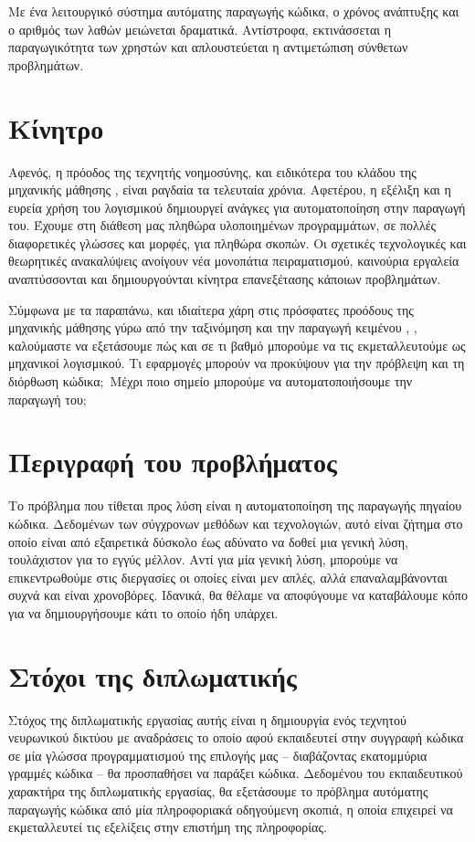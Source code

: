Με ένα λειτουργικό σύστημα αυτόματης παραγωγής κώδικα, ο χρόνος ανάπτυξης και ο αριθμός των λαθών μειώνεται δραματικά. 
Αντίστροφα, εκτινάσσεται η παραγωγικότητα των χρηστών και απλουστεύεται η αντιμετώπιση σύνθετων προβλημάτων.

\section{Κίνητρο}
Αφενός, η πρόοδος της τεχνητής νοημοσύνης, και ειδικότερα του κλάδου της μηχανικής μάθησης , είναι ραγδαία τα τελευταία χρόνια.
Αφετέρου, η εξέλιξη και η ευρεία χρήση του λογισμικού δημιουργεί ανάγκες για αυτοματοποίηση στην παραγωγή του.
Έχουμε στη διάθεση μας πληθώρα υλοποιημένων προγραμμάτων, σε πολλές διαφορετικές γλώσσες και μορφές, για πληθώρα σκοπών.
Οι σχετικές τεχνολογικές και θεωρητικές ανακαλύψεις ανοίγουν νέα μονοπάτια πειραματισμού, καινούρια εργαλεία αναπτύσσονται και δημιουργούνται κίνητρα επανεξέτασης κάποιων προβλημάτων.

Σύμφωνα με τα παραπάνω, και ιδιαίτερα χάρη στις πρόσφατες προόδους της μηχανικής μάθησης γύρω από την ταξινόμηση και την παραγωγή κειμένου \cite{Graves2013}, \cite{Liu2016}, καλούμαστε να εξετάσουμε πώς και σε τι βαθμό μπορούμε να τις εκμεταλλευτούμε ως μηχανικοί λογισμικού. Τι εφαρμογές μπορούν να προκύψουν για την πρόβλεψη και τη διόρθωση κώδικα$;$ Μέχρι ποιο σημείο μπορούμε να αυτοματοποιήσουμε την παραγωγή του$;$

\section{Περιγραφή του προβλήματος}
Το πρόβλημα που τίθεται προς λύση είναι η αυτοματοποίηση της παραγωγής πηγαίου κώδικα. 
Δεδομένων των σύγχρονων μεθόδων και τεχνολογιών, αυτό είναι ζήτημα στο οποίο είναι από εξαιρετικά δύσκολο έως αδύνατο να δοθεί μια γενική λύση, τουλάχιστον για το εγγύς μέλλον.
Αντί για μία γενική λύση, μπορούμε να επικεντρωθούμε στις διεργασίες οι οποίες είναι μεν απλές, αλλά επαναλαμβάνονται συχνά και είναι χρονοβόρες.
Ιδανικά, θα θέλαμε να αποφύγουμε να καταβάλουμε κόπο για να δημιουργήσουμε κάτι το οποίο ήδη υπάρχει. 

\section{Στόχοι της διπλωματικής}

Στόχος της διπλωματικής εργασίας αυτής είναι η δημιουργία ενός τεχνητού νευρωνικού δικτύου με αναδράσεις  το οποίο αφού εκπαιδευτεί στην συγγραφή κώδικα σε μία γλώσσα προγραμματισμού της επιλογής μας -- διαβάζοντας εκατομμύρια γραμμές κώδικα -- θα προσπαθήσει να παράξει κώδικα. Δεδομένου του εκπαιδευτικού χαρακτήρα της διπλωματικής εργασίας, θα εξετάσουμε το πρόβλημα αυτόματης παραγωγής κώδικα από μία πληροφοριακά οδηγούμενη  σκοπιά, η οποία επιχειρεί να εκμεταλλευτεί τις εξελίξεις στην επιστήμη της πληροφορίας.

